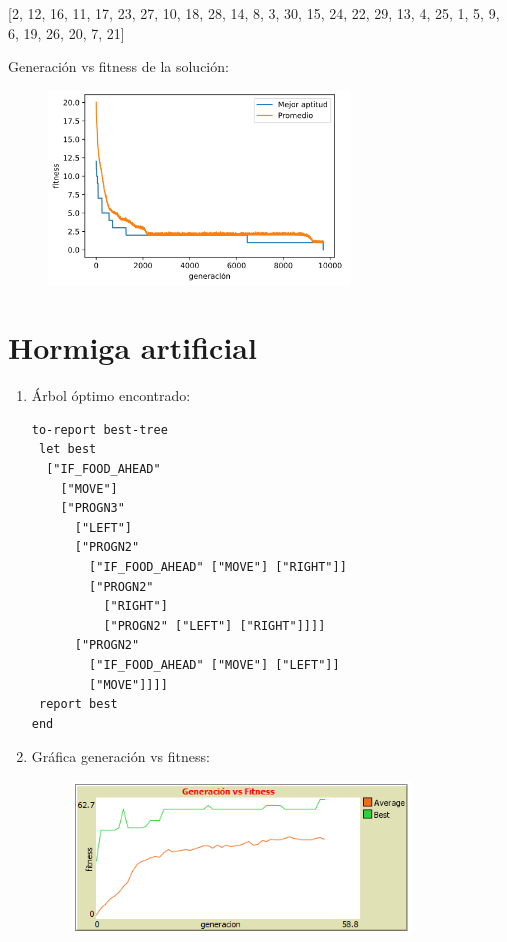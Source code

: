 \documentclass[11pt,letterpaper]{article}
\begin{document}
    [2, 12, 16, 11, 17, 23, 27, 10, 18, 28, 14, 8, 3, 30, 15, 24, 22, 29, 13, 4, 25, 1, 5, 9, 6, 19, 26, 20, 7, 21]

    Generación vs fitness de la solución:
    \begin{figure}[H]
        \centering
        \includegraphics[width=8cm]{images/reinas-grafica.png}
        \label{fig:reinas-grafica}
    \end{figure}

    \clearpage
    \section{Hormiga artificial}
    \begin{enumerate}[label=\alph*)]
        \item Árbol óptimo encontrado:
        \begin{lstlisting}
to-report best-tree
 let best
  ["IF_FOOD_AHEAD"
    ["MOVE"]
    ["PROGN3"
      ["LEFT"]
      ["PROGN2"
        ["IF_FOOD_AHEAD" ["MOVE"] ["RIGHT"]]
        ["PROGN2"
          ["RIGHT"]
          ["PROGN2" ["LEFT"] ["RIGHT"]]]]
      ["PROGN2"
        ["IF_FOOD_AHEAD" ["MOVE"] ["LEFT"]]
        ["MOVE"]]]]
 report best
end
        \end{lstlisting}
        \item Gráfica generación vs fitness:
        \begin{figure}[H]
            \centering
            \includegraphics[width=9cm]{images/hormiga-grafica.png}
            \label{fig:hormiga-grafica}
        \end{figure}
    \end{enumerate}
\end{document}
